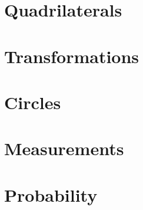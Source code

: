 \documentclass[]{book}
\begin{document}
\chapter{Quadrilaterals}\label{quadrilaterals}

\chapter{Transformations}\label{transformations}

\chapter{Circles}\label{circles}

\chapter{Measurements}\label{measurements}

\chapter{Probability}\label{probability}


\end{document}
